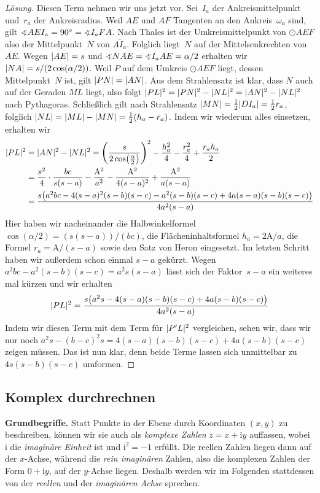 \begin{proof}[Lösung]
	Diesen Term nehmen wir uns jetzt vor. Sei~$I_a$ der Ankreismittelpunkt und~$r_a$ der Ankreisradius. Weil $AE$ und $AF$ Tangenten an den Ankreis~$\omega_a$ sind, gilt $\winkel AEI_a=90^\circ=\winkel I_aFA$. Nach Thales ist der Umkreismittelpunkt von $\odot AEF$ also der Mittelpunkt~$N$ von $\overline{AI_a}$. Folglich liegt~$N$ auf der Mittelsenkrechten von $\overline{AE}$. Wegen $\lvert AE\rvert=s$ und $\winkel NAE=\winkel I_aAE=\alpha/2$ erhalten wir $\lvert NA\rvert=s/(2\cos(\alpha/2))$. Weil $P$ auf dem Umkreis $\odot AEF$ liegt, dessen Mittelpunkt~$N$ ist, gilt $\lvert PN\rvert=\lvert AN\rvert$. Aus dem Strahlensatz ist klar, dass $N$ auch auf der Geraden $ML$ liegt, also folgt $\lvert PL\rvert^2=\lvert PN\rvert^2-\lvert NL\rvert^2=\lvert AN\rvert^2-\lvert NL\rvert^2$ nach Pythagoras. Schließlich gilt nach Strahlensatz $\lvert MN\rvert=\frac12\lvert DI_a\rvert=\frac12r_a$, folglich $\lvert NL\rvert=\lvert ML\rvert-\lvert MN\rvert=\frac12(h_a-r_a)$. Indem wir wiederum alles einsetzen, erhalten wir
	\begin{align*}
		\abs{PL}^2&=\abs{AN}^2-\abs{NL}^2=\parens*{\frac{s}{2\cos\parens[\big]{\frac\alpha2}}}^2-\frac{h_a^2}{4}-\frac{r_a^2}{4}+\frac{r_ah_a}{2}\\
		&=\frac{s^2}{4}\cdot\frac{bc}{s(s-a)}-\frac{\mathrm{A}^2}{a^2}-\frac{\mathrm{A}^2}{4(s-a)^2}+\frac{\mathrm{A}^2}{a(s-a)}\\
		&=\frac{s\parens*{a^2bc-4(s-a)^2(s-b)(s-c)-a^2(s-b)(s-c)+4a(s-a)(s-b)(s-c)}}{4a^2(s-a)}
	\end{align*}
	Hier haben wir nacheinander die Halbwinkelformel $\cos(\alpha/2)=(s(s-a))/(bc)$, die Flächeninhaltsformel $h_a=2\mathrm{A}/a$, die Formel $r_a=\mathrm{A}/(s-a)$ sowie den Satz von Heron eingesetzt. Im letzten Schritt haben wir außerdem schon einmal $s-a$ gekürzt. Wegen $a^2bc-a^2(s-b)(s-c)=a^2s(s-a)$ lässt sich der Faktor~$s-a$ ein weiteres mal kürzen und wir erhalten
	\begin{equation*}
		\abs{PL}^2=\frac{s\parens*{a^2s-4(s-a)(s-b)(s-c)+4a(s-b)(s-c)}}{4a^2(s-a)}
	\end{equation*}
	Indem wir diesen Term mit dem Term für $\lvert P'L\rvert^2$ vergleichen, sehen wir, dass wir nur noch $a^2s-(b-c)^2s=4(s-a)(s-b)(s-c)+4a(s-b)(s-c)$ zeigen müssen. Das ist nun klar, denn beide Terme lassen sich unmittelbar zu $4s(s-b)(s-c)$ umformen.
\end{proof}

\subsection*{Komplex durchrechnen}
\textbf{Grundbegriffe.} Statt Punkte in der Ebene durch Koordinaten $(x,y)$ zu beschreiben, können wir sie auch als \emph{komplexe Zahlen} $z=x+\mathrm{i} y$ auffassen, wobei $\mathrm{i}$ die \emph{imaginäre Einheit} ist und $\mathrm{i}^2=-1$ erfüllt. Die reellen Zahlen liegen dann auf der $x$-Achse, während die \emph{rein imaginären} Zahlen, also die komplexen Zahlen der Form $0+\mathrm{i} y$, auf der $y$-Achse liegen. Deshalb werden wir im Folgenden stattdessen von der \emph{reellen} und der \emph{imaginären Achse} sprechen.
	
